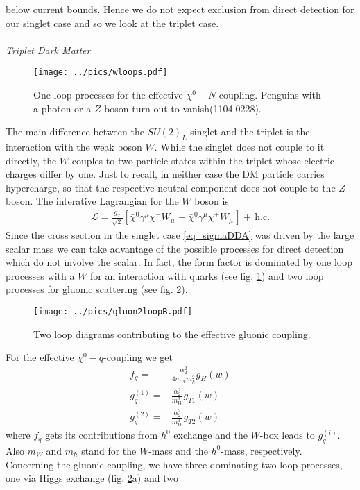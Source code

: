 below current bounds. Hence we do not expect exclusion from direct detection for our singlet case and so we look at the triplet case.
\\ \\ \textit{Triplet Dark Matter}\\
\begin{figure}[t]
 \texttt{[image: ../pics/wloops.pdf]}
 \caption{One loop processes for the effective $\chi^0-N$ coupling. Penguins with a photon or a $Z$-boson turn out to vanish(1104.0228).}
 \label{pic_wloop}
\end{figure}
The main difference between the $SU(2)_L$ singlet and the triplet is the interaction with the weak boson $W$. While the singlet does not couple to
it directly, the $W$ couples to two particle states within the triplet whose electric charges differ by one. Just to recall, in neither case the 
DM particle carries hypercharge, so that the respective neutral component does not couple to the $Z$ boson. The interative Lagrangian for the $W$ 
boson is 
\begin{align}
 \mathcal{L} = \frac{g_2}{\sqrt{2}} \left[\bar \chi^0 \gamma^\mu \chi^- W^+_\mu + \bar \chi^0 \gamma^\mu \chi^+W^-_\mu\right] +\, \text{h.c.}
\end{align}
Since the cross section in the singlet case \eqref{eq_sigmaDDA} was driven by the large scalar mass we can take advantage of the possible processes
for direct detection which do not involve the scalar. In fact, the form factor is dominated by one loop processes with a $W$ for an interaction with
quarks (see fig. \ref{pic_wloop}) and two loop processes for gluonic scattering (see fig. \ref{pic_2loopgluon}).
\begin{figure}[t]
 \texttt{[image: ../pics/gluon2loopB.pdf]}
 \caption{Two loop diagrams contributing to the effective gluonic coupling.}
 \label{pic_2loopgluon}
\end{figure}
For the effective $\chi^0-q$-coupling we get
\begin{align}
 f_q =& \frac{\alpha_2^2}{4m_W m_{h}^2} g_H(w)\\
 g^{(1)}_q =& \frac{\alpha_2^2}{m_W^3}g_{T1}(w)\\
 g^{(2)}_q =&\frac{\alpha_2^2}{m_W^3}g_{T2}(w) 
\end{align}
where $f_q$ gets its contributions from $h^0$ exchange and the $W$-box leads to $g^{(i)}_q$. Also $m_W$ and $m_h$ stand for the $W$-mass and the 
$h^0$-mass, respectively.\\
\noindent Concerning the gluonic coupling, we have three dominating two loop processes, one via Higgs exchange (fig. \ref{pic_2loopgluon}a) and two
